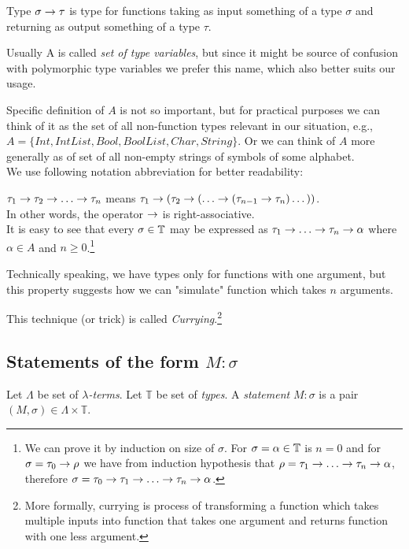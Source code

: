 \documentclass[12pt,a4paper]{report}
\newcommand{\lterms}{$\lambda$-terms\xspace}
\begin{document}
Type $\sigma \rightarrow \tau$ is type for functions taking as input
something of a type $\sigma$ and returning 
as output something of a type $\tau$. 

Usually A is called \textit{set of type variables}, 
but since it might be source of confusion with polymorphic type variables
we prefer this name, which also better suits our usage. 

Specific definition of $A$ is not so important, but for practical purposes 
we can think of it as the set of all non-function types relevant in our
situation, e.g., $A = \{ Int , IntList , Bool, BoolList , Char, String \}$.
Or we can think of $A$ more generally as of set of all non-empty strings
of symbols of some alphabet. \\

We use following notation
abbreviation for better readability:

$\tau_1 \ar \tau_2 \ar \dots \ar \tau_n$ means 
$\tau_1 \ar (\tau_2 \ar (\dots \ar (\tau_{n-1} \ar \tau_n)\dots))$.\\

In other words, the operator $\rightarrow$ is right-associative.\\

It is easy to see that every $\sigma \in \mathbb{T}$ may be expressed as 
$\tau_1 \ar \dots \ar \tau_n \ar \alpha$ 
where $\alpha \in A$ and $n \geq 0$.\footnote{ 
We can prove it by induction on size of $\sigma$. 
For $\sigma = \alpha \in \mathbb{T}$ is $n = 0$ and for $\sigma = \tau_0 \rightarrow \rho$
we have from induction hypothesis that $\rho = \tau_1 \ar \dots \ar \tau_n \ar \alpha$,
therefore
$\sigma = \tau_0 \ar \tau_1 \ar \dots \ar \tau_n \ar \alpha$.}

Technically speaking, we have types only for functions with one argument, but
this property suggests how we can "simulate" function which takes $n$ arguments.

This technique (or trick) is called \textit{Currying}.\footnote{More formally,
currying is process of transforming a
function which takes multiple inputs
into function that takes one argument and
returns function with one less argument.}   

	
\subsection{Statements of the form $M : \sigma$}

\begin{definition}
	Let $\Lambda$ be set of {\it \lterms}. 
	Let $\mathbb{T}$ be set of {\it types}.       
	A {\it statement} $M : \sigma$ is a pair 
	$(M,\sigma) \in \Lambda \times \mathbb{T}$.
	\\ 
\end{definition}
	
\end{document}
